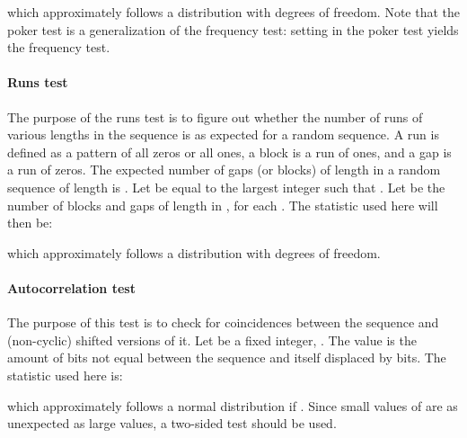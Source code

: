 \documentclass[journal]{IEEEtran}
\begin{document}
which approximately follows a  distribution with  degrees of freedom. Note that the poker test is a generalization of the frequency test: setting  in the poker test yields the frequency test.

\paragraph{Runs test}
The purpose of the runs test is to figure out whether the number of runs of various lengths in the sequence  is as expected for a random sequence. A run is defined as a pattern of all zeros or all ones, a block is a run of ones, and a gap is a run of zeros. The expected number of gaps (or blocks) of length  in a random sequence of length  is . Let  be equal to the largest integer  such that . Let
 be the number of blocks and gaps of length  in , for each . The statistic used here will then be:

\noindent which approximately follows a  distribution with  degrees of freedom.


\paragraph{Autocorrelation test}

The purpose of this test is to check for coincidences between the sequence  and (non-cyclic) shifted versions of it. Let  be a fixed integer, . The value  is the amount of bits not equal between the sequence and itself displaced by  bits. The statistic used here is:\newline

\noindent which approximately follows a normal distribution  if . Since small values of  are as unexpected as large values, a two-sided test should be used.
\end{document}
